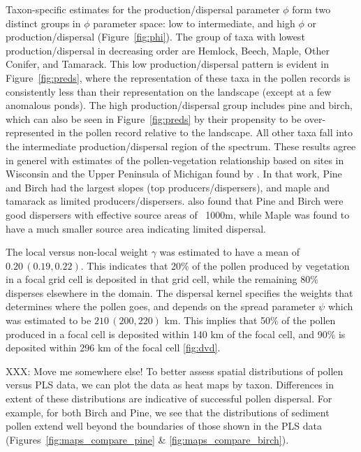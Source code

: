 \documentclass[12pt]{article}
\begin{document}
Taxon-specific estimates for the production/dispersal parameter $\phi$
form two distinct groups in $\phi$ parameter space: low to
intermediate, and high $\phi$ or production/dispersal
(Figure~\ref{fig:phi}). The group of taxa with lowest
production/dispersal in decreasing order are Hemlock, Beech, Maple,
Other Conifer, and Tamarack. This low production/dispersal pattern is
evident in Figure~\ref{fig:preds}, where the representation of these
taxa in the pollen records is consistently less than their
representation on the landscape (except at a few anomalous ponds). The
high production/dispersal group includes pine and birch, which can
also be seen in Figure~\ref{fig:preds} by their propensity to be
over-represented in the pollen record relative to the landscape. All
other taxa fall into the intermediate production/dispersal region of
the spectrum. These results agree in generel with estimates of the
pollen-vegetation relationship based on sites in Wisconsin and the
Upper Peninsula of Michigan found by \cite{prentice1986}. In that
work, Pine and Birch had the largest slopes (top
producers/dispersers), and maple and tamarack as limited
producers/dispersers. \cite{jackson1990} also found that Pine and
Birch were good dispersers with effective source areas of ~1000m,
while Maple was found to have a much smaller source area indicating
limited dispersal.

The local versus non-local weight $\gamma$ was estimated to have a
mean of $0.20\,(0.19, 0.22)$. This indicates that 20\% of the pollen
produced by vegetation in a focal grid cell is deposited in that grid
cell, while the remaining 80\% disperses elsewhere in the domain. The
dispersal kernel specifies the weights that determines where the
pollen goes, and depends on the spread parameter $\psi$ which was
estimated to be $210\,(200, 220)$ km. This implies that 50\% of the
pollen produced in a focal cell is deposited within 140 km of the
focal cell, and 90\% is deposited within 296 km of the focal cell \ref{fig:dvd}.

XXX: Move me somewhere else!
To better assess spatial distributions of pollen versus PLS data, we
can plot the data as heat maps by taxon. Differences in extent of these
distributions are indicative of successful pollen dispersal. For
example, for both Birch and Pine, we see that the distributions of
sediment pollen extend well beyond the boundaries of those shown in the PLS
data (Figures~\ref{fig:maps_compare_pine} \& \ref{fig:maps_compare_birch}). 
\end{document}
